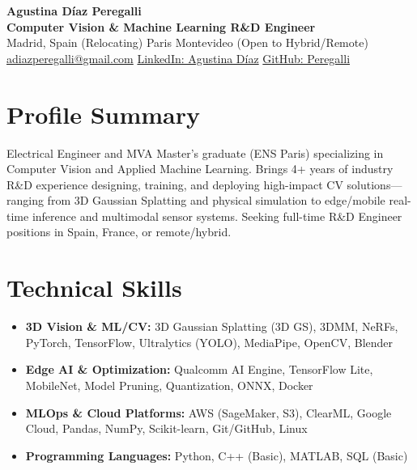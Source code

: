 \documentclass[10pt, a4paper]{article}
\begin{document}
\begin{center}
    {\LARGE \textbf{Agustina Díaz Peregalli}} \\ \vspace{2pt}
    {\large \textbf{Computer Vision \& Machine Learning R\&D Engineer}} \\ \vspace{2pt}
    Madrid, Spain (Relocating) \textbar{} Paris \textbar{} Montevideo \textbar{} (Open to Hybrid/Remote) \\ \vspace{2pt}
    \href{mailto:adiazperegalli@gmail.com}{adiazperegalli@gmail.com} \textbar{} 
    \href{https://www.linkedin.com/in/agustina-diaz-peregalli/}{LinkedIn: Agustina Díaz} \textbar{} 
    \href{https://github.com/Peregalli}{GitHub: Peregalli}
\end{center}

\section{Profile Summary}
Electrical Engineer and MVA Master's graduate (ENS Paris) specializing in Computer Vision and Applied Machine Learning. Brings 4+ years of industry R\&D experience designing, training, and deploying high-impact CV solutions—ranging from 3D Gaussian Splatting and physical simulation to edge/mobile real-time inference and multimodal sensor systems. Seeking full-time R\&D Engineer positions in Spain, France, or remote/hybrid.

\section{Technical Skills}
\begin{itemize}
    \item \textbf{3D Vision \& ML/CV:} 3D Gaussian Splatting (3D GS), 3DMM, NeRFs, PyTorch, TensorFlow, Ultralytics (YOLO), MediaPipe, OpenCV, Blender
    \item \textbf{Edge AI \& Optimization:} Qualcomm AI Engine, TensorFlow Lite, MobileNet, Model Pruning, Quantization, ONNX, Docker
    \item \textbf{MLOps \& Cloud Platforms:} AWS (SageMaker, S3), ClearML, Google Cloud, Pandas, NumPy, Scikit-learn, Git/GitHub, Linux
    \item \textbf{Programming Languages:} Python, C++ (Basic), MATLAB, SQL (Basic)
\end{itemize}
\end{document}
